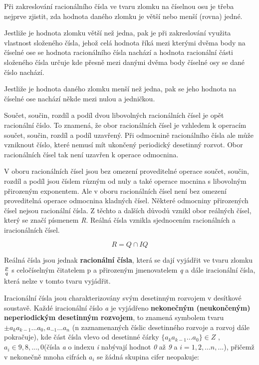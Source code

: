 Při zakreslování racionálního čísla ve tvaru zlomku na číselnou osu je třeba nejprve zjistit, zda hodnota daného zlomku je větší nebo menší (rovna) jedné.

Jestliže je hodnota zlomku větší než jedna, pak je při zakreslování využita vlastnost složeného čísla, jehož celá hodnota říká mezi kterými dvěma body na číselné ose se hodnota racionálního čísla nachází a hodnota racionální části složeného čísla určuje kde přesně mezi danými dvěma body číselné osy se dané číslo nachází.

\vskip 4mm
\centerline{}
\vskip 4mm

Jestliže je hodnota daného zlomku menší než jedna, pak se jeho hodnota na číselné ose nachází někde mezi nulou a jedničkou.


Součet, součin, rozdíl a podíl dvou libovolných racionálních čísel je opět racionální číslo. To znamená, že obor racionálních čísel je vzhledem k operacím součet, součin, rozdíl a podíl uzavřený. Při odmocnině racionálního čísla ale může vzniknout číslo, které nemusí mít ukončený periodický desetinný rozvot. Obor racionálních čísel tak není uzavřen k operace odmocnina.


V oboru racionálních čísel jsou bez omezení proveditelné operace součet, součin, rozdíl a podíl jsou číslem různým od nuly a také operace mocnina s libovolným přirozeným exponentem. Ale v oboru racionálních čísel není bez omezení proveditelná operace odmocnina kladných čísel. Některé odmocniny přirozených čísel nejsou racionální čísla. Z těchto a dalších důvodů vznikl obor reálných čísel, který se značí písmenem {\it R}. Reálná čísla vznikla sjednocením racionálních a iracionálních čísel.

$$ R = Q \cap IQ $$


Reálná čísla jsou jednak {\bf racionální čísla}, která se dají vyjádřit ve tvaru zlomku $p \over q$ s celočíselným čitatelem {\it }p a přirozeným jmenovatelem {\it q} a dále iracionální čísla, která nelze v tomto tvaru vyjádřit.

Iracionální čísla jsou charakterizovány svým desetinným rozvojem v desítkové soustavě. Každé iracionální číslo {\it a} je vyjádřeno {\bf nekonečným (neukončeným) neperiodickým desetinným rozvojem}, to znamená symbolem tvaru $ \pm a_k a_{k-1} ... a_0,a_{-1} ...a_{n} $ (n zaznamenaných číslic desetinného rozvoje a rozvoj dále pokračuje), kde část čísla vlevo od desetinné čárky $\{a_k a_{k-1}...a_0\}\in Z$ , $a_i \in {9, 8, ..., 0}$(čísla {\it a} o indexu {\it i} nabývají hodnot {\it 0} až {\it 9} a $i=1,2,...n,...$), přičemž v nekonečně mnoha cifrách $a_i$ se žádná skupina cifer neopakuje:


